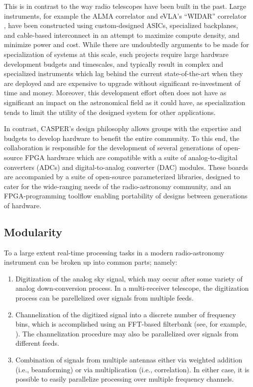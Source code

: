 \documentclass{ws-jai}
\begin{document}
This is in contrast to the way radio telescopes have been built in the past.
Large instruments, for example the ALMA correlator \citep{alma-correlator} and
eVLA's ``WIDAR'' correlator \citep{evla}, have been constructed using
custom-designed ASICs, specialized
backplanes, and cable-based interconnect in an attempt to maximize compute
density, and minimize power and cost. While there are undoubtedly arguments to be made for specialization of systems at this scale, such projects require large
hardware development budgets and timescales, and typically result in complex
and specialized instruments which lag behind the current state-of-the-art when they are deployed and are expensive to upgrade without significant
re-investment of time and money. Moreover, this development effort often does not have as significant an impact on the astronomical field as it could have, as specialization tends to limit the utility of the designed system for other applications.

In contrast, CASPER's design philosophy allows groups with the expertise and
budgets to develop hardware to benefit the entire community. To this end, the collaboration
is responsible for the development of several generations of open-source FPGA hardware which are compatible with a suite of analog-to-digital converters (ADCs) and digital-to-analog converter (DAC) modules. These boards are accompanied by a suite of open-source parameterized libraries, designed to cater for the wide-ranging needs of the radio-astronomy community, and an FPGA-programming toolflow enabling portability of designs between generations of hardware.



\subsection{Modularity}

To a large extent real-time processing tasks in a modern
radio-astronomy instrument can be broken up into common parts; namely:
\begin{enumerate}
    \item Digitization of the analog sky signal, which may occur after
    some variety of analog down-conversion process. In a multi-receiver telescope, the digitization process can be parellelized over signals from multiple feeds.
    
    \item Channelization of the digitized signal into a discrete number of
    frequency bins, which is accomplished using an FFT-based filterbank
    (see, for example, \citet{specbook}). The channelization procedure may also be parallelized over signals from different feeds.
    
    \item Combination of signals from multiple antennas either via weighted addition (i.e., beamforming) or via multiplication (i.e.,
    correlation). In either case, it is possible to easily parallelize processing
    over multiple frequency channels.
\end{enumerate}
\end{document}
